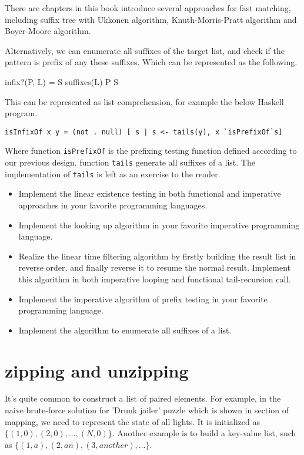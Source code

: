\documentclass{article}
\begin{document}
There are chapters in this book introduce several approaches for fast matching, including 
suffix tree with Ukkonen algorithm, Knuth-Morris-Pratt algorithm and Boyer-Moore algorithm.

Alternatively, we can enumerate all suffixes of the target list, and check if the pattern 
is prefix of any these suffixes. Which can be represented as the following.

\be
infix?(P, L) = \exists S \in suffixes(L) \land P \subseteq S
\ee

This can be represented as list comprehension, for example the below Haskell program.

\lstset{language=Haskell}
\begin{lstlisting}
isInfixOf x y = (not . null) [ s | s <- tails(y), x `isPrefixOf`s]
\end{lstlisting}

Where function \verb|isPrefixOf| is the prefixing testing function defined according to
our previous design. function \verb|tails| generate all suffixes of a list. The implementation
of \verb|tails| is left as an exercise to the reader.

\begin{Exercise}
\begin{itemize}
\item Implement the linear existence testing in both functional and imperative approaches in 
your favorite programming languages.
\item Implement the looking up algorithm in your favorite imperative programming language.
\item Realize the linear time filtering algorithm by firstly building the result list in reverse
order, and finally reverse it to resume the normal result. Implement this algorithm in both
imperative looping and functional tail-recursion call.
\item Implement the imperative algorithm of prefix testing in your favorite programming language.
\item Implement the algorithm to enumerate all suffixes of a list.
\end{itemize}
\end{Exercise}

\section{zipping and unzipping}

It's quite common to construct a list of paired elements. For example, in the naive 
brute-force solution for 'Drunk jailer' puzzle which is shown in section of mapping,
we need to represent the state of all lights. It is initialized as $\{(1, 0), (2, 0), ..., (N, 0)\}$.
Another example is to build a key-value list, such as $\{(1, a), (2, an), (3, another), ... \}$.
\end{document}
